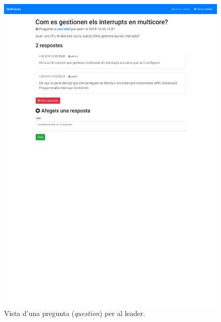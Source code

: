 \documentclass[catalan, a4paper]{scrartcl}
\begin{document}
\begin{figure}
\centering \includegraphics[trim={0 16cm 0 0}, clip, width=.98\columnwidth, cframe=gray]{screens/question_admin.pdf}
\caption{\label{fig:question_admin} Vista d'una pregunta (\emph{question}) per al leader. }
\end{figure}
\end{document}
